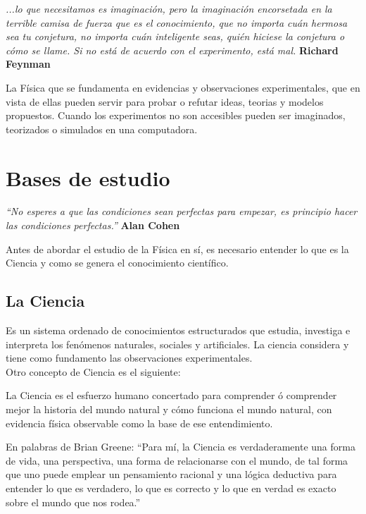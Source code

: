 \documentclass[a5paper,pagesize,10pt,bibtotoc,pointlessnumbers,
normalheadings,DIV=9,fleqn,x11names,table,twoside=false]{scrbook}
\begin{document}
\textit{...lo que necesitamos es imaginación, pero la imaginación encorsetada en la terrible camisa de fuerza que es el 
conocimiento, que no importa cuán hermosa sea tu conjetura, no importa cuán inteligente seas, quién hiciese la conjetura o cómo se 
llame. Si no está de acuerdo con el experimento, está mal.} \textbf{Richard Feynman}

\vspace{1.0cm}

La Física que se fundamenta en evidencias y observaciones experimentales, que en vista de ellas pueden servir para probar o 
refutar ideas, teorias y modelos propuestos. Cuando los experimentos no son accesibles pueden ser imaginados, teorizados o 
simulados en una computadora.

\chapter{Bases de estudio}

\textit{``No esperes a que las condiciones sean perfectas para empezar, es principio hacer las condiciones perfectas.''} 
\textbf{Alan Cohen}
\vspace{1.0cm}

Antes de abordar el estudio de la Física en sí, es necesario entender lo que es la Ciencia y como se genera el conocimiento 
científico.

\section{La Ciencia}

Es un sistema ordenado de conocimientos estructurados que estudia, investiga e interpreta los fenómenos naturales, sociales y 
artificiales. La ciencia  considera y tiene como fundamento las observaciones experimentales.\\ 

Otro concepto de Ciencia es el siguiente:

\begin{tcolorbox}
La Ciencia es el esfuerzo humano concertado para comprender ó comprender mejor la historia del mundo natural y cómo funciona el 
mundo natural, con evidencia física observable como la base de ese entendimiento.
\end{tcolorbox}

En palabras de Brian Greene: ``Para mí, la Ciencia es verdaderamente una forma de vida, una perspectiva, una forma de relacionarse 
con el mundo, de tal forma que uno puede emplear un pensamiento racional y una lógica deductiva para entender lo que es verdadero, 
lo que es correcto y lo que en verdad es exacto sobre el mundo que nos rodea.''\\
 
\end{document}
